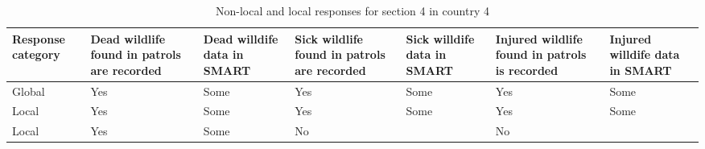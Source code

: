 \documentclass[
  letterpaper,
  DIV=11,
  numbers=noendperiod]{scrartcl}
\begin{document}
\begin{table}[H]

\caption{Non-local and local responses for section 4 in country 4}
\centering
\begin{tabular}[t]{>{\raggedright\arraybackslash}p{2cm}|>{\raggedright\arraybackslash}p{2cm}|>{\raggedright\arraybackslash}p{2cm}|>{\raggedright\arraybackslash}p{2cm}|>{\raggedright\arraybackslash}p{2cm}|>{\raggedright\arraybackslash}p{2cm}|>{\raggedright\arraybackslash}p{2cm}}
\hline
Response
category & Dead wildlife
found in patrols
are recorded & Dead willdife
data in SMART & Sick wildlife
found in patrols
are recorded & Sick willdife
data in SMART & Injured wildlife
found in patrols
is recorded & Injured willdife
data in SMART\\
\hline
Global & Yes & Some & Yes & Some & Yes & Some\\
\hline
Local & Yes & Some & Yes & Some & Yes & Some\\
\hline
Local & Yes & Some & No &  & No & \\
\hline
\end{tabular}
\end{table}
\end{document}
